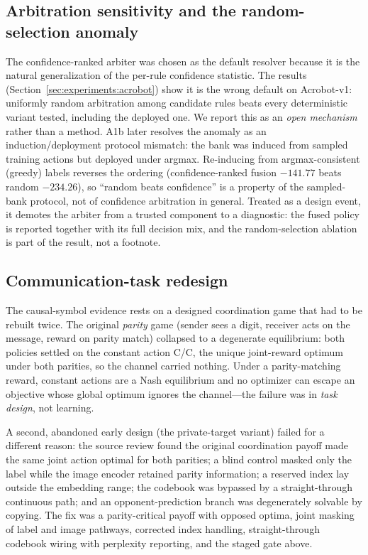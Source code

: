 \documentclass[11pt]{article}
\begin{document}
\subsection{Arbitration sensitivity and the random-selection anomaly}
\label{sec:evolution:arbiter}

The confidence-ranked arbiter was chosen as the default resolver because it is the natural
generalization of the per-rule confidence statistic. The results (Section~\ref{sec:experiments:acrobot})
show it is the wrong default on Acrobot-v1: uniformly random arbitration among candidate rules beats
every deterministic variant tested, including the deployed one. We report this as an \emph{open
mechanism} rather than a method. A1b later resolves the anomaly as an induction/deployment protocol
mismatch: the bank was induced from sampled training actions but deployed under argmax. Re-inducing from
argmax-consistent (greedy) labels reverses the ordering (confidence-ranked fusion $-141.77$ beats random
$-234.26$), so ``random beats confidence'' is a property of the sampled-bank protocol, not of confidence
arbitration in general. Treated as a design event, it demotes the arbiter from a trusted
component to a diagnostic: the fused policy is reported together with its full decision mix, and the
random-selection ablation is part of the result, not a footnote.

\subsection{Communication-task redesign}
\label{sec:evolution:comm}

The causal-symbol evidence rests on a designed coordination game that had to be rebuilt twice. The
original \emph{parity} game (sender sees a digit, receiver acts on the message, reward on parity match)
collapsed to a degenerate equilibrium: both policies settled on the constant action C/C, the unique
joint-reward optimum under both parities, so the channel carried nothing. Under a parity-matching
reward, constant actions are a Nash equilibrium and no optimizer can escape an objective whose global
optimum ignores the channel---the failure was in \emph{task design}, not learning.

A second, abandoned early design (the private-target variant) failed for a different reason: the
source review found the original coordination payoff made the same joint action optimal for both
parities; a blind control masked only the label while the image encoder retained parity information;
a reserved index lay outside the embedding range; the codebook was bypassed by a straight-through
continuous path; and an opponent-prediction branch was degenerately solvable by copying. The fix was a
parity-critical payoff with opposed optima, joint masking of label and image pathways, corrected index
handling, straight-through codebook wiring with perplexity reporting, and the staged gate above.
\end{document}
